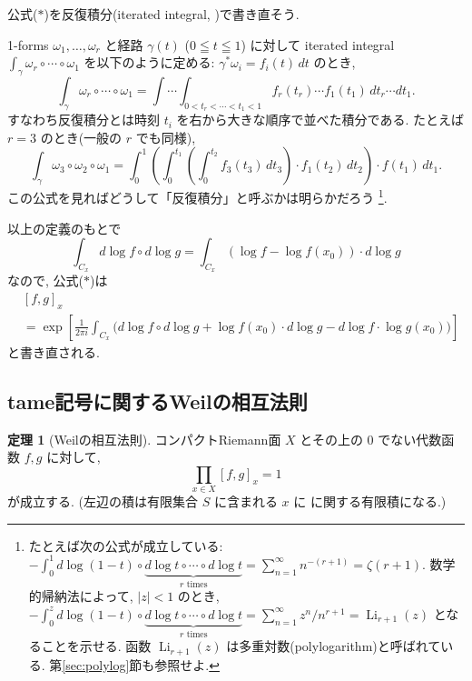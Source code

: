 \documentclass[12pt,twoside]{jarticle}
\theoremstyle{definition} %
\newtheorem{theorem}{定理}
\theoremstyle{definition} %
\theoremstyle{definition} %
\numberwithin{theorem}{section}
\numberwithin{equation}{section}
\numberwithin{figure}{section}
\numberwithin{table}{section}
\newcommand\secref[1]{第\ref{#1}節}
\newcommand\tame[3]{\left[#2,#3\right]_{#1}}
\newcommand\Li{\operatorname{Li}}
\begin{document}
公式($*$)を反復積分(iterated integral, \cite{chen})で書き直そう.

1-forms $\omega_1,\ldots,\omega_r$ と経路 $\gamma(t)$ ($0\leqq t\leqq 1$)
に対して iterated integral $\int_\gamma \omega_r\circ\cdots\circ\omega_1$ 
を以下のように定める: $\gamma^*\omega_i=f_i(t)\,dt$ のとき,
\[
\int_\gamma \omega_r\circ\cdots\circ\omega_1
=\int\!\cdots\!\int_{0<t_r<\cdots<t_1<1}
 f_r(t_r)\cdots f_1(t_1) \,dt_r\cdots dt_1.
\]
すなわち反復積分とは時刻 $t_i$ を右から大きな順序で並べた積分である.
たとえば $r=3$ のとき(一般の $r$ でも同様), 
\[
\int_\gamma \omega_3\circ\omega_2\circ\omega_1
=\int_0^1 \left(\int_0^{t_1} \left(\int_0^{t_2}
 f_3(t_3)\,dt_3\right)\cdot f_1(t_2)\,dt_2\right)\cdot f(t_1)\,dt_1.
\]
この公式を見ればどうして「反復積分」と呼ぶかは明らかだろう%
\footnote{たとえば次の公式が成立している: \(
-\int_0^1 d\log(1-t)\circ\underbrace{d\log t\circ\cdots\circ d\log t}_{\text{$r$ times}}
= \sum_{n=1}^\infty n^{-(r+1)} = \zeta(r+1)
\).
数学的帰納法によって, $|z|<1$ のとき, \(
-\int_0^z d\log(1-t)\circ\underbrace{d\log t\circ\cdots\circ d\log t}_{\text{$r$ times}}
= \sum_{n=1}^\infty z^n/n^{r+1}
= \Li_{r+1}(z)
\) となることを示せる. 函数 $\Li_{r+1}(z)$ は多重対数(polylogarithm)と呼ばれている.
\secref{sec:polylog}も参照せよ.
}.


以上の定義のもとで
\[
\int_{C_x} d\log f\circ d\log g
=\int_{C_x} \left(\log f - \log f(x_0)\right)\cdot d\log g
\]
なので, 公式($*$)は
\begin{align*}
&
\tame{x}{f}{g}
\\ &
=
\exp\left[
\frac{1}{2\pi i}\int_{C_x} \bigl(
  d\log f\circ d\log g + \log f(x_0)\cdot d\log g - d\log f\cdot\log g(x_0)
\bigr)
\right]
\tag{$\ast\ast$}
\end{align*}
と書き直される.


\subsection{tame記号に関するWeilの相互法則}

\begin{theorem}[Weilの相互法則]
コンパクトRiemann面 $X$ とその上の $0$ でない代数函数 $f,g$ に対して, 
\[
\prod_{x\in X} \tame{x}{f}{g} = 1
\]
が成立する. (左辺の積は有限集合 $S$ に含まれる $x$ に
に関する有限積になる.)
\end{theorem}
\end{document}
